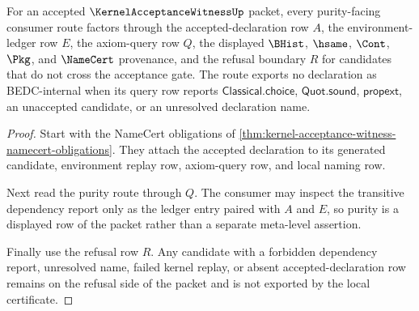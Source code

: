 \begin{theorem}
\label{thm:kernel-acceptance-witness-ledger-purity}
For an accepted $\KernelAcceptanceWitnessUp$ packet, every purity-facing consumer route factors through the accepted-declaration row $A$, the environment-ledger row $E$, the axiom-query row $Q$, the displayed $\BHist$, $\hsame$, $\Cont$, $\Pkg$, and $\NameCert$ provenance, and the refusal boundary $R$ for candidates that do not cross the acceptance gate. The route exports no declaration as BEDC-internal when its query row reports $\mathsf{Classical.choice}$, $\mathsf{Quot.sound}$, $\mathsf{propext}$, an unaccepted candidate, or an unresolved declaration name.
\end{theorem}
\begin{proof}
Start with the NameCert obligations of \autoref{thm:kernel-acceptance-witness-namecert-obligations}. They attach the accepted declaration to its generated candidate, environment replay row, axiom-query row, and local naming row.

Next read the purity route through $Q$. The consumer may inspect the transitive dependency report only as the ledger entry paired with $A$ and $E$, so purity is a displayed row of the packet rather than a separate meta-level assertion.

Finally use the refusal row $R$. Any candidate with a forbidden dependency report, unresolved name, failed kernel replay, or absent accepted-declaration row remains on the refusal side of the packet and is not exported by the local certificate.
\end{proof}

